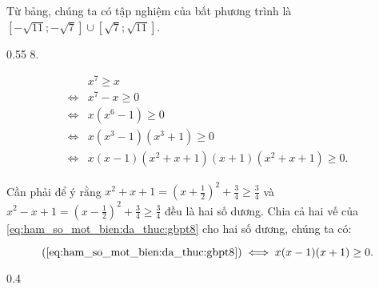 Từ bảng, chúng ta có tập nghiệm của bất phương trình là $\left[-\sqrt{11}; -\sqrt{7}\right] \cup \left[\sqrt{7}; \sqrt{11}\right]$.

{
   \begin{minipageindent}{0.55\textwidth}
      8.

      \begin{align}
         &x^7 \geq x \nonumber\\
         \iff &x^7 - x \geq 0  \nonumber\\
         \iff &x(x^6 - 1) \geq 0 \nonumber\\
         \iff &x(x^3 - 1)(x^3 + 1) \geq 0 \nonumber\\
         \iff &x(x-1)(x^2 + x + 1)(x+1)(x^2 + x + 1) \geq 0. \label{eq:ham_so_mot_bien:da_thuc:gbpt8}
      \end{align}

      Cần phải để ý rằng $x^2 + x + 1 = \left(x + \frac{1}{2}\right)^2 + \frac{3}{4} \geq \frac{3}{4}$ và $x^2 - x + 1 = \left(x - \frac{1}{2}\right)^2 + \frac{3}{4} \geq \frac{3}{4}$ đều là hai số dương. Chia cả hai vế của \ref{eq:ham_so_mot_bien:da_thuc:gbpt8} cho hai số dương, chúng ta có:

      \begin{equation}
         \text{(\ref{eq:ham_so_mot_bien:da_thuc:gbpt8})} \iff x(x-1)(x + 1) \geq 0. \label{eq:ham_so_mot_bien:da_thuc:gbpt8_2}
      \end{equation}
   \end{minipageindent}
   \hfill
   \begin{minipageindent}{0.4\textwidth}
      \begin{figure}[H]
         \centering
\end{figure}
\end{minipageindent}}
